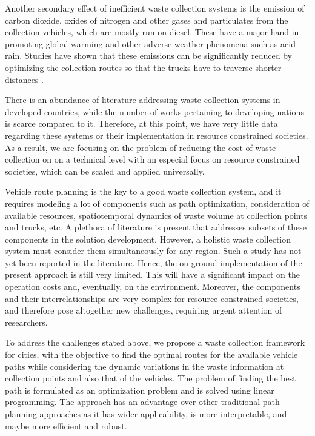 \documentclass[12pt]{article}
\begin{document}
Another secondary effect of inefficient waste collection systems is the emission of carbon dioxide, oxides of nitrogen and other gases and particulates from the collection vehicles, which are mostly run on diesel. These have a major hand in promoting global warming and other adverse weather phenomena such as acid rain. Studies have shown that these emissions can be significantly reduced by optimizing the collection routes so that the trucks have to traverse shorter distances \cite{apaydin2007route}. 

There is an abundance of literature addressing waste collection systems in developed countries, while the number of works pertaining to developing nations is scarce compared to it. Therefore, at this point, we have very little data regarding these systems or their implementation in resource constrained societies. As a result, we are focusing on the problem of reducing the cost of waste collection on on a technical level with an especial focus on resource constrained societies, which can be scaled and applied universally.

Vehicle route planning is the key to a good waste collection system, and it requires modeling a lot of components such as path optimization, consideration of available resources, spatiotemporal dynamics of waste volume at collection points and trucks, etc. A plethora of literature is present that addresses subsets of these components in the solution development. However, a holistic waste collection system must consider them simultaneously for any region. Such a study has not yet been reported in the literature. Hence, the on-ground implementation of the present approach is still very limited. This will have a significant impact on the operation costs and, eventually, on the environment. Moreover, the components and their interrelationships are very complex for resource constrained societies, and therefore pose altogether new challenges, requiring urgent attention of researchers.

To address the challenges stated above, we propose a waste collection framework for cities, with the objective to find the optimal routes for the available vehicle paths while considering the dynamic variations in the waste information at collection points and also that of the vehicles. The problem of finding the best path is formulated as an optimization problem and is solved using linear programming. The approach has an advantage over other traditional path planning approaches as it has wider applicability, is more interpretable, and maybe more efficient and robust.
\end{document}
